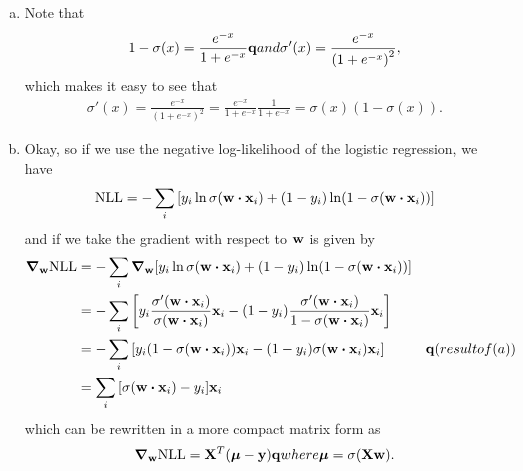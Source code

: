 \documentclass[12pt,letterpaper]{hmcpset}
\begin{document}
\begin{solution}
	\begin{enumerate}[(a)]
		\item Note that 
		\begin{align*}
			1 - \sigma(x) = \frac{e^{-x}}{1+ e^{-x}} {\bf q}{and} \sigma'(x) = \frac{e^{-x}}{\left(1 + e^{-x}\right)^2},
		\end{align*}
		which makes it easy to see that
		\begin{align*}
			\sigma'(x) = \frac{e^{-x}}{\left(1 + e^{-x}\right)^2} = \frac{e^{-x}}{1+ e^{-x}} \frac{1}{1+ e^{-x}} = \sigma(x) (1 - \sigma(x)).
		\end{align*}


		\item Okay, so if we use the negative log-likelihood of the logistic regression, we have
		\begin{align*}
			{\rm NLL} = - \sum_i \qty[ y_i \ln \sigma(\vb w \vdot \vb x_i) + (1 - y_i) \ln(1 - \sigma(\vb w \vdot \vb x_i))]
		\end{align*}
		and if we take the gradient with respect to $\vb w$ is given by 
		\begin{align*}
			\grad_{\vb w} {\rm NLL} &= - \sum_i \grad_{\vb w} \qty[ y_i \ln \sigma(\vb w \vdot \vb x_i) + (1 - y_i) \ln(1 - \sigma(\vb w \vdot \vb x_i))] \\
			&= -\sum_i \qty[ y_i \frac{\sigma'(\vb w \vdot \vb x_i)}{\sigma(\vb w \vdot \vb x_i)}\vb x_i 
			-
			(1 - y_i) \frac{\sigma'(\vb w \vdot \vb x_i)}{1 - \sigma(\vb w \vdot \vb x_i)} \vb x_i
			] \\
			&= -\sum_i \qty[ y_i (1 - \sigma(\vb w \vdot \vb x_i))\vb x_i 
			-
			(1 - y_i) \sigma(\vb w \vdot \vb x_i)\vb x_i
			] &\qq{(result of (a))} \\
			&= \sum_i \qty[ \sigma(\vb w \vdot \vb x_i) - y_i]\vb x_i
		\end{align*}
		which can be rewritten in a more compact matrix form as
		\begin{align*}
			\grad_{\vb w} {\rm NLL} = \vb X^T (\boldsymbol\mu - \vb y) {\bf q}{where} \hbox{\boldmath$\mu$} = \sigma(\vb X \vb w ).
		\end{align*}


\end{enumerate}
\end{solution}
\end{document}
